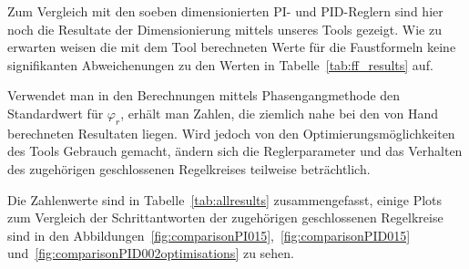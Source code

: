 Zum  Vergleich  mit  den  soeben  dimensionierten  PI-  und  PID-Reglern  sind
hier   noch  die   Resultate   der  Dimensionierung   mittels  unseres   Tools
gezeigt. Wie  zu erwarten  weisen die  mit  dem Tool  berechneten Werte  f\"ur
die  Faustformeln   keine  signifikanten  Abweichenungen  zu   den  Werten  in
Tabelle~\ref{tab:ff_results} auf.

Verwendet man  in den Berechnungen mittels  Phasengangmethode den Standardwert
f\"ur $\varphi_r$,  erh\"alt man Zahlen,  die ziemlich  nahe bei den  von Hand
berechneten Resultaten liegen. Wird jedoch von den Optimierungsm\"oglichkeiten
des   Tools  Gebrauch   gemacht,   \"andern  sich   die  Reglerparameter   und
das   Verhalten  des   zugeh\"origen   geschlossenen  Regelkreises   teilweise
betr\"achtlich.

Die        Zahlenwerte       sind        in       Tabelle~\ref{tab:allresults}
zusammengefasst,       einige       Plots        zum       Vergleich       der
Schrittantworten    der   zugeh\"origen    geschlossenen   Regelkreise    sind
in    den    Abbildungen~\ref{fig:comparisonPI015},~\ref{fig:comparisonPID015}
und~\ref{fig:comparisonPID002optimisations} zu sehen.

